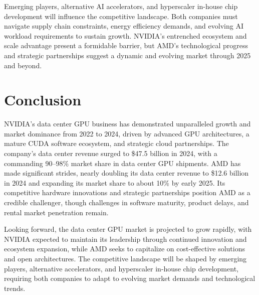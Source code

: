 \documentclass{article}
\begin{document}
Emerging players, alternative AI accelerators, and hyperscaler in-house chip development will influence the competitive landscape. Both companies must navigate supply chain constraints, energy efficiency demands, and evolving AI workload requirements to sustain growth. NVIDIA's entrenched ecosystem and scale advantage present a formidable barrier, but AMD's technological progress and strategic partnerships suggest a dynamic and evolving market through 2025 and beyond.

\section{Conclusion}

NVIDIA's data center GPU business has demonstrated unparalleled growth and market dominance from 2022 to 2024, driven by advanced GPU architectures, a mature CUDA software ecosystem, and strategic cloud partnerships. The company's data center revenue surged to \$47.5 billion in 2024, with a commanding 90--98\% market share in data center GPU shipments. AMD has made significant strides, nearly doubling its data center revenue to \$12.6 billion in 2024 and expanding its market share to about 10\% by early 2025. Its competitive hardware innovations and strategic partnerships position AMD as a credible challenger, though challenges in software maturity, product delays, and rental market penetration remain.

Looking forward, the data center GPU market is projected to grow rapidly, with NVIDIA expected to maintain its leadership through continued innovation and ecosystem expansion, while AMD seeks to capitalize on cost-effective solutions and open architectures. The competitive landscape will be shaped by emerging players, alternative accelerators, and hyperscaler in-house chip development, requiring both companies to adapt to evolving market demands and technological trends.
\end{document}
